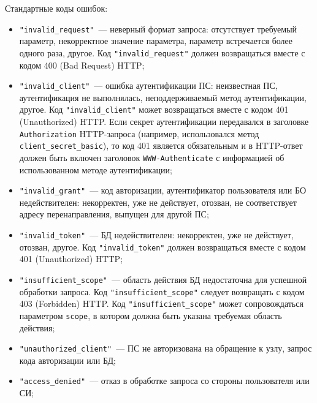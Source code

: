 Стандартные коды ошибок:
\begin{itemize}
\item
\lstinline{"invalid_request"}~---
неверный формат запроса: отсутствует требуемый параметр, некорректное значение
параметра, параметр встречается более одного раза, другое.
%
Код \lstinline{"invalid_request"} должен возвращаться вместе с кодом 400 
(Bad Request) HTTP;

\item
\lstinline{"invalid_client"}~---
ошибка аутентификации ПС: неизвестная ПС, аутентификация не выполнялась, 
неподдерживаемый метод аутентификации, другое.
%
Код \lstinline{"invalid_client"} может возвращаться вместе с кодом 401 
(Unauthorized) HTTP.
%
Если секрет аутентификации передавался в заголовке \lstinline{Authorization} 
HTTP-запроса (например, использовался метод \lstinline{client_secret_basic}),
то код 401 является обязательным и в HTTP-ответ должен быть включен заголовок 
\lstinline{WWW-Authenticate} с информацией об использованном методе 
аутентификации;
%

\item
\lstinline{"invalid_grant"}~---
код авторизации, аутентификатор пользователя или БО недействителен: 
некорректен, уже не действует, отозван, 
не соответствует адресу перенаправления, выпущен для другой ПС;
%

\item
\lstinline{"invalid_token"}~--- 
БД недействителен: некорректен, уже не действует, отозван, другое. 
%
Код \lstinline{"invalid_token"} должен возвращаться вместе с кодом 
401 (Unauthorized) HTTP;

\item
\lstinline{"insufficient_scope"}~---
область действия БД недостаточна для успешной обработки запроса.
%
Код \lstinline{"insufficient_scope"} следует возвращать с кодом 
403 (Forbidden) HTTP. 
%
Код \lstinline{"insufficient_scope"} может сопровождаться
параметром \lstinline{scope}, в котором должна быть указана требуемая
область действия;

\item
\lstinline{"unauthorized_client"}~--- 
ПС не авторизована на обращение к узлу, запрос кода авторизации или БД;

\item
\lstinline{"access_denied"}~---
отказ в обработке запроса со стороны пользователя или СИ;


\end{itemize}
